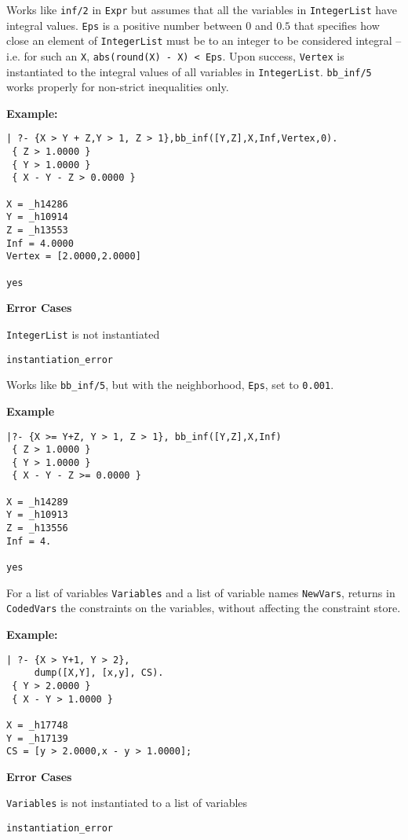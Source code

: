 \begin{description}
%
Works like {\tt inf/2} in {\tt Expr} but assumes that all the
variables in {\tt IntegerList} have integral values.  {\tt Eps} is a
positive number between $0$ and $0.5$ that specifies how close an
element of {\tt IntegerList} must be to an integer to be considered
integral -- i.e. for such an {\tt X}, {\tt abs(round(X) - X) < Eps}.
Upon success, {\tt Vertex} is instantiated to the integral values of
all variables in {\tt IntegerList}.  {\tt bb\_inf/5} works properly for
non-strict inequalities only.

{\bf Example:}
{\small
\begin{verbatim}
| ?- {X > Y + Z,Y > 1, Z > 1},bb_inf([Y,Z],X,Inf,Vertex,0).
 { Z > 1.0000 }
 { Y > 1.0000 }
 { X - Y - Z > 0.0000 }

X = _h14286
Y = _h10914
Z = _h13553
Inf = 4.0000
Vertex = [2.0000,2.0000]

yes
\end{verbatim}
}
%
{\bf Error Cases}
\bi
\item 	{\tt IntegerList} is not instantiated
\bi
\item 	{\tt instantiation\_error}
\ei
\ei


%
Works like {\tt bb\_inf/5}, but with the neighborhood, {\tt Eps}, set
to {\tt 0.001}.

{\bf Example}
{\small
\begin{verbatim}
|?- {X >= Y+Z, Y > 1, Z > 1}, bb_inf([Y,Z],X,Inf)
 { Z > 1.0000 }
 { Y > 1.0000 }
 { X - Y - Z >= 0.0000 }

X = _h14289
Y = _h10913
Z = _h13556
Inf = 4.

yes
\end{verbatim}
}


%
For a list of variables {\tt Variables} and a list of variable names
{\tt NewVars}, returns in {\tt CodedVars} the constraints on the
variables, without affecting the constraint store.

{\bf Example:}
{\small
\begin{verbatim}
| ?- {X > Y+1, Y > 2},
     dump([X,Y], [x,y], CS).
 { Y > 2.0000 }
 { X - Y > 1.0000 }

X = _h17748
Y = _h17139
CS = [y > 2.0000,x - y > 1.0000];
\end{verbatim}
}
%
{\bf Error Cases}
\bi
\item 	{\tt Variables} is not instantiated to a list of variables
\bi
\item 	{\tt instantiation\_error}
\ei
\ei


\end{description}
